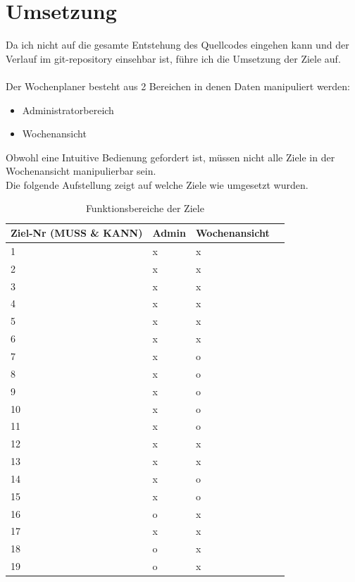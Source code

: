 \section{Umsetzung}
Da ich nicht auf die gesamte Entstehung des Quellcodes eingehen kann und der Verlauf im git-repository einsehbar ist,
führe ich die Umsetzung der Ziele auf.\\\\
Der Wochenplaner besteht aus 2 Bereichen in denen Daten manipuliert werden:
\begin{itemize}
    \item Administratorbereich
    \item Wochenansicht\\
\end{itemize}
Obwohl eine Intuitive Bedienung gefordert ist, müssen nicht alle Ziele in der Wochenansicht manipulierbar sein.\\
Die folgende Aufstellung zeigt auf welche Ziele wie umgesetzt wurden.\\

\begin{table}[!ht]
\begin{center}
    \begin{longtable}{llp{3cm}l}
        \toprule Ziel-Nr (MUSS \& KANN) & Admin & Wochenansicht \\
        \midrule 1 & x & x \\
        \midrule 2 & x & x \\
        \midrule 3 & x & x \\
        \midrule 4 & x & x \\
        \midrule 5 & x & x \\
        \midrule 6 & x & x \\ 
        \midrule 7 & x & o \\
        \midrule 8 & x & o \\
        \midrule 9 & x & o \\
        \midrule 10 & x & o \\
        \midrule 11 & x & o \\
        \midrule 12 & x & x \\
        \midrule 13 & x & x \\
        \midrule 14 & x & o \\
        \midrule 15 & x & o \\
        \midrule 16 & o & x \\
        \midrule 17 & x & x \\
        \midrule 18 & o & x \\
        \midrule 19 & o & x \\
        \bottomrule
        \end{longtable}
    \caption{Funktionsbereiche der Ziele}
    \label{tab:funktionsbereiche_ziele}
\end{center}
\end{table}

